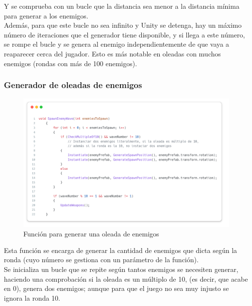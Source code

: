 \documentclass[11pt]{article}
\begin{document}
                \newpage
                Y se comprueba con un bucle que la distancia sea menor a la distancia mínima para generar a los enemigos.\\

                Además, para que este bucle no sea infinito y Unity se detenga, hay un máximo número de iteraciones que el generador tiene disponible, y si llega a este número, se rompe el bucle y se genera al enemigo independientemente de que vaya a reaparecer cerca del jugador. Esto es más notable en oleadas con muchos enemigos (rondas con más de 100 enemigos).\\

            \newpage
            \subsubsection{Generador de oleadas de enemigos}
                \begin{figure}[H]
                    \centering
                    \includegraphics[width=\textwidth]{Images/Misc/SpawnEnemyWave.png}
                    \caption{Función para generar una oleada de enemigos}
                \end{figure}
                Esta función se encarga de generar la cantidad de enemigos que dicta según la ronda (cuyo número se gestiona con un parámetro de la función).\\

                Se inicializa un bucle que se repite según tantos enemigos se necesiten generar, haciendo una comprobación si la oleada es un múltiplo de 10, (es decir, que acabe en 0), genera dos enemigos; aunque para que el juego no sea muy injusto se ignora la ronda 10. \\
\end{document}
